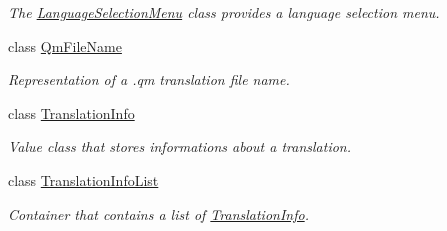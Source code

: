 \begin{DoxyCompactItemize}
\begin{DoxyCompactList}\small\item\em The \hyperlink{class_mdt_1_1_translation_1_1_language_selection_menu}{Language\+Selection\+Menu} class provides a language selection menu. \end{DoxyCompactList}\item 
class \hyperlink{class_mdt_1_1_translation_1_1_qm_file_name}{Qm\+File\+Name}
\begin{DoxyCompactList}\small\item\em Representation of a .qm translation file name. \end{DoxyCompactList}\item 
class \hyperlink{class_mdt_1_1_translation_1_1_translation_info}{Translation\+Info}
\begin{DoxyCompactList}\small\item\em Value class that stores informations about a translation. \end{DoxyCompactList}\item 
class \hyperlink{class_mdt_1_1_translation_1_1_translation_info_list}{Translation\+Info\+List}
\begin{DoxyCompactList}\small\item\em Container that contains a list of \hyperlink{class_mdt_1_1_translation_1_1_translation_info}{Translation\+Info}. \end{DoxyCompactList}\end{DoxyCompactItemize}

